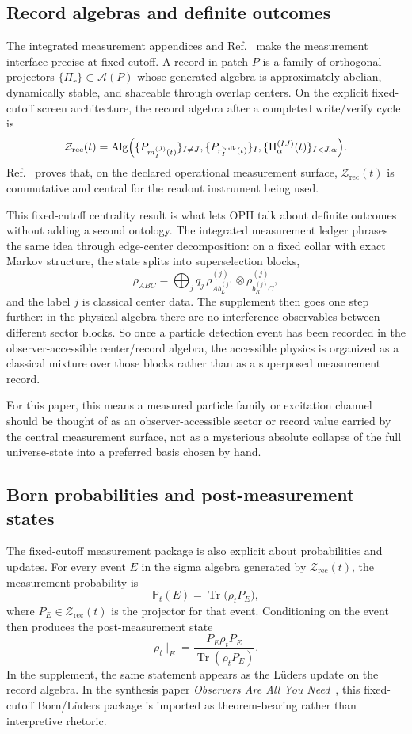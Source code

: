 \documentclass[11pt]{article}
\begin{document}
\subsection{Record algebras and definite outcomes}

The integrated measurement appendices and Ref.~\cite{ophmicrophysics} make the measurement
interface precise at fixed cutoff. A record in patch \(P\) is a family of orthogonal projectors
\(\{\Pi_r\}\subset\mathcal A(P)\) whose generated algebra is approximately abelian, dynamically
stable, and shareable through overlap centers. On the explicit fixed-cutoff screen architecture,
the record algebra after a completed write/verify cycle is
\[
\mathcal Z_{\mathrm{rec}}(t)
=
\mathrm{Alg}\Bigl(
\{P_{m_I^{(J)}(t)}\}_{I\neq J},
\{P_{r_I^{\mathrm{bulk}}(t)}\}_I,
\{\Pi_\alpha^{(IJ)}(t)\}_{I<J,\alpha}
\Bigr).
\]
Ref.~\cite{ophmicrophysics} proves that, on the declared operational measurement surface,
\(\mathcal Z_{\mathrm{rec}}(t)\) is commutative and central for the readout instrument being
used.

This fixed-cutoff centrality result is what lets OPH talk about definite outcomes without adding
a second ontology. The integrated measurement ledger phrases the same idea through edge-center
decomposition: on a fixed collar with exact Markov structure, the state splits into
superselection blocks,
\[
\rho_{ABC}
=
\bigoplus_j
q_j\,
\rho^{(j)}_{A b_L^{(j)}}\otimes \rho^{(j)}_{b_R^{(j)} C},
\]
and the label \(j\) is classical center data. The supplement then goes one step further: in the
physical algebra there are no interference observables between different sector blocks. So once a
particle detection event has been recorded in the observer-accessible center/record algebra, the
accessible physics is organized as a classical mixture over those blocks rather than as a
superposed measurement record.

For this paper, this means a measured particle family or excitation channel should be
thought of as an observer-accessible sector or record value carried by the central measurement
surface, not as a mysterious absolute collapse of the full universe-state into a preferred basis
chosen by hand.

\subsection{Born probabilities and post-measurement states}

The fixed-cutoff measurement package is also explicit about probabilities and updates. For every
event \(E\) in the sigma algebra generated by \(\mathcal Z_{\mathrm{rec}}(t)\), the measurement
probability is
\[
\mathbb P_t(E)=\operatorname{Tr}\!\bigl(\rho_t P_E\bigr),
\]
where \(P_E\in\mathcal Z_{\mathrm{rec}}(t)\) is the projector for that event. Conditioning on the
event then produces the post-measurement state
\[
\rho_t\!\mid_E
=
\frac{P_E\rho_t P_E}{\operatorname{Tr}(\rho_t P_E)}.
\]
In the supplement, the same statement appears as the L\"uders update on the record algebra. In
the synthesis paper \emph{Observers Are All You Need}~\cite{ophsynthesis}, this fixed-cutoff Born/L\"uders package is imported as theorem-bearing
rather than interpretive rhetoric.
\end{document}
